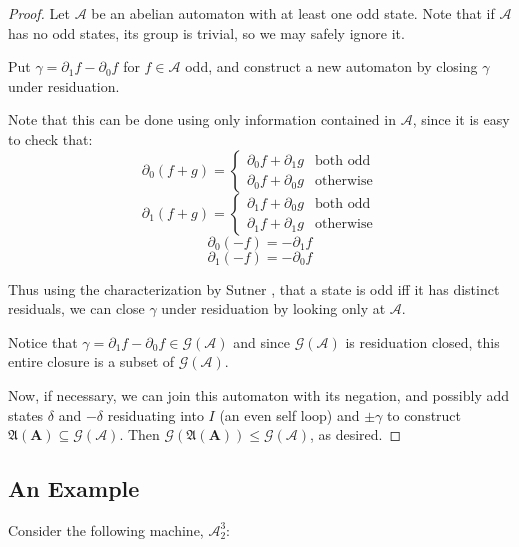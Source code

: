 \documentclass[12pt]{article}
\newcommand{\A}{\mathcal{A}}
\newcommand{\G}{\mathcal{G}}
\renewcommand{\P}{\mathfrak{A}}
\newcommand{\2}{\textbf{2}}
\newcommand{\Am}{\textbf{A}}
\newcommand{\del}{\partial}
\begin{document}
\begin{proof}
  Let $\A$ be an abelian automaton with at least one odd state.
  Note that if $\A$ has no odd states, its group is trivial, so we may
  safely ignore it.

  Put $\gamma = \del_1 f - \del_0 f$ for $f \in \A$ odd, and construct
  a new automaton by closing $\gamma$ under residuation.

  Note that this can be done using only information contained in $\A$,
  since it is easy to check that:
  \[
    \del_0(f + g) = \begin{cases} \del_0 f + \del_1 g & \text{both odd}\\
                                  \del_0 f + \del_0 g & \text{otherwise}
                    \end{cases}
  \]
  \[
    \del_1(f + g) = \begin{cases} \del_1 f + \del_0 g & \text{both odd}\\
                                  \del_1 f + \del_1 g & \text{otherwise}
                    \end{cases}
  \]
  \[
    \del_0 (-f) = - \del_1 f
  \]
  \[
    \del_1 (-f) = - \del_0 f
  \]

  Thus using the characterization by Sutner \cite{Sutner18:abelian_automata}, 
  that a state is odd iff it has distinct residuals, we can close $\gamma$ 
  under residuation by looking only at $\A$.

  Notice that $\gamma = \del_1 f - \del_0 f \in \G(\A)$ and since $\G(\A)$
  is residuation closed, this entire closure is a subset of $\G(\A)$. 

  Now, if necessary, we can join this automaton with its negation, and
  possibly add states $\delta$ and $-\delta$ residuating into $I$
  (an even self loop) and $\pm \gamma$ to construct 
  $\P(\Am) \subseteq \G(\A)$. Then $\G(\P(\Am)) \leq \G(\A)$, as desired.
\end{proof}

\subsection{An Example}
Consider the following machine, $\A^3_2$:
\end{document}
